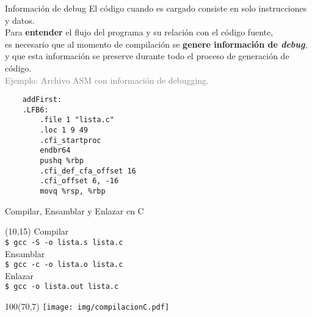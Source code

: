 \documentclass[aspectratio=169]{beamer}
\begin{document}
\begin{frame}[fragile,t]{Información de debug}
    El código cuando es cargado consiste en solo instrucciones y datos.\\
    \bigskip
    Para \textbf{entender} el flujo del programa y su relación con el código fuente,\\
    es necesario que al momento de compilación se \textbf{genere información de \emph{debug}},\\
    y que esta información se preserve durante todo el proceso de generación de código.\\
    \bigskip
    \pause
    \textcolor{gray}{Ejemplo: Archivo ASM con información de debugging.}
    { \small
    \begin{verbatim}
    addFirst:
    .LFB6:
        .file 1 "lista.c"
        .loc 1 9 49
        .cfi_startproc
        endbr64
        pushq %rbp
        .cfi_def_cfa_offset 16
        .cfi_offset 6, -16
        movq %rsp, %rbp
    \end{verbatim}
    }
\end{frame}


\begin{frame}[fragile,t]{Compilar, Ensamblar y Enlazar en C}
    \begin{textblock}{60}(10,15)
    \textcolor{naranjauca}{Compilar}\\
    \texttt{\$ gcc -S -o lista.s lista.c}\\
    \bigskip
    \textcolor{naranjauca}{Ensamblar}\\
    \texttt{\$ gcc -c -o lista.o lista.c}\\ %
    \bigskip
    \textcolor{naranjauca}{Enlazar}\\
    \texttt{\$ gcc -o lista.out lista.c}\\
    \end{textblock}
    \begin{textblock}{100}(70,7)
     \texttt{[image: img/compilacionC.pdf]}
    \end{textblock}
\end{frame}

\end{document}

